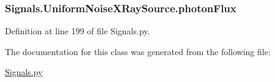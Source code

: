 \subsubsection[{\texorpdfstring{photon\+Flux}{photonFlux}}]{\setlength{\rightskip}{0pt plus 5cm}Signals.\+Uniform\+Noise\+X\+Ray\+Source.\+photon\+Flux}\hypertarget{classSignals_1_1UniformNoiseXRaySource_af240be1882d819db77da73100c4c95c5}{}\label{classSignals_1_1UniformNoiseXRaySource_af240be1882d819db77da73100c4c95c5}


Definition at line 199 of file Signals.\+py.



The documentation for this class was generated from the following file\+:\begin{DoxyCompactItemize}
\item 
\hyperlink{Signals_8py}{Signals.\+py}\end{DoxyCompactItemize}
